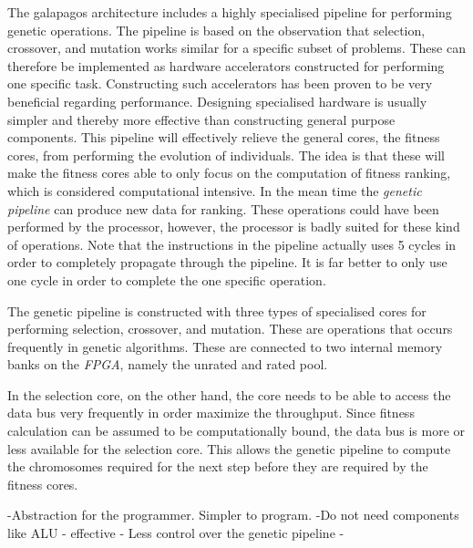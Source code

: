 The galapagos architecture includes a highly specialised pipeline for performing genetic operations. The pipeline is based on the observation that selection, crossover, and mutation works similar for a specific subset of problems. These can therefore be implemented as hardware accelerators constructed for performing one specific task. Constructing such accelerators has been proven to be very beneficial regarding performance.  Designing specialised hardware is usually simpler and thereby more effective than constructing general purpose components. This pipeline will effectively relieve the general cores, the fitness cores, from performing the evolution of individuals. The idea is that these will make the fitness cores able to only focus on the computation of fitness ranking, which is considered computational intensive. In the mean time the \emph{genetic pipeline} can produce new data for ranking. These operations could have been performed by the processor, however, the processor is badly suited for these kind of operations. Note that the instructions in the pipeline actually uses 5 cycles in order to completely propagate through the pipeline. It is far better to only use one cycle in order to complete the one specific operation.  

The genetic pipeline is constructed with three types of specialised cores for performing selection, crossover, and mutation. These are operations that occurs frequently in genetic algorithms. These are connected to two internal memory banks on the \emph{FPGA}, namely the unrated and rated pool.

In the selection core, on the other hand, the core needs to be able to access the data bus very frequently in order maximize the throughput.
Since fitness calculation can be assumed to be computationally bound, the data bus is more or less available for the selection core.
This allows the genetic pipeline to compute the chromosomes required for the next step before they are required by the fitness cores. 


-Abstraction for the programmer. Simpler to program.
-Do not need components like ALU
- effective 
- Less control over the genetic pipeline
- 


